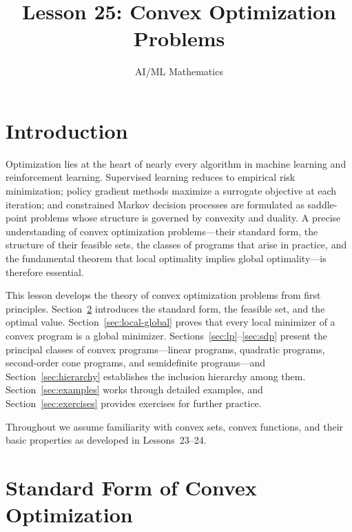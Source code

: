 \documentclass[11pt,a4paper]{article}
\title{Lesson 25: Convex Optimization Problems}
\author{AI/ML Mathematics}
\date{}
\begin{document}
\maketitle
\tableofcontents
\newpage


\section{Introduction}\label{sec:intro}

Optimization lies at the heart of nearly every algorithm in machine learning and
reinforcement learning. Supervised learning reduces to empirical risk minimization;
policy gradient methods maximize a surrogate objective at each iteration; and
constrained Markov decision processes are formulated as saddle-point problems
whose structure is governed by convexity and duality. A precise understanding of
convex optimization problems---their standard form, the structure of their feasible
sets, the classes of programs that arise in practice, and the fundamental theorem
that local optimality implies global optimality---is therefore essential.

This lesson develops the theory of convex optimization problems from first
principles. Section~\ref{sec:standard-form} introduces the standard form, the
feasible set, and the optimal value. Section~\ref{sec:local-global} proves that
every local minimizer of a convex program is a global minimizer.
Sections~\ref{sec:lp}--\ref{sec:sdp} present the principal classes of convex
programs---linear programs, quadratic programs, second-order cone programs, and
semidefinite programs---and Section~\ref{sec:hierarchy} establishes the inclusion
hierarchy among them. Section~\ref{sec:examples} works through detailed examples,
and Section~\ref{sec:exercises} provides exercises for further practice.

Throughout we assume familiarity with convex sets, convex functions, and their
basic properties as developed in Lessons~23--24.


\section{Standard Form of Convex Optimization}\label{sec:standard-form}
\end{document}
